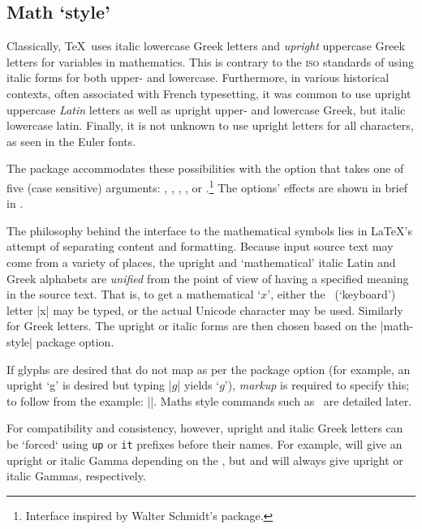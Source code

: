\subsection{Math `style'}

Classically, \TeX\ uses italic lowercase Greek letters and \emph{upright}
uppercase Greek letters for variables in mathematics. This is contrary to
the \textsc{iso} standards of using italic forms for both upper- and lowercase.
Furthermore, in various historical contexts, often associated with French typesetting, it was common to use upright uppercase \emph{Latin} letters as well as upright
upper- and lowercase Greek, but italic lowercase latin. Finally, it is not unknown to use upright letters
for all characters, as seen in the Euler fonts.

The  package accommodates these possibilities with the
option  that takes one of five (case sensitive) arguments:
, , , , or .\footnote{Interface inspired by Walter Schmidt's  package.}
The  options' effects are shown in brief in .

The philosophy behind the interface to the mathematical symbols
lies in \LaTeX's attempt of separating content and formatting. Because input
source text may come from a variety of places, the upright and
`mathematical' italic Latin and Greek alphabets are \emph{unified} from the
point of view of having a specified meaning in the source text. That is, to
get a mathematical ‘$x$’, either the \ascii\ (`keyboard') letter |x| may
be typed, or the actual Unicode character may be used. Similarly for Greek
letters. The upright or italic forms are then chosen based on the
|math-style| package option.

If glyphs are desired that do not map as per the package option (for
example, an upright `g' is desired but typing |$g$| yields `$g$'),
\emph{markup} is required to specify this; to follow from the example:
||.
Maths style commands such as \cmd\symup\ are detailed later.

For compatibility and consistency, however, upright and italic Greek letters
can be `forced` using \verb|up| or \verb|it| prefixes before their names.
For example,  will give an upright or italic Gamma depending on the
, but  and  will always give upright
or italic Gammas, respectively.

